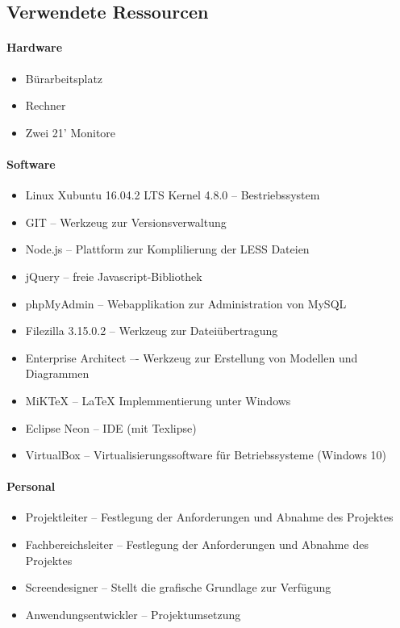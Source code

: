 \subsection{Verwendete Ressourcen}
\label{list:Ressourcenplanung}

\paragraph{Hardware}
\begin{itemize}
	\item Bürarbeitsplatz
	\item Rechner
	\item Zwei 21' Monitore
\end{itemize}

\paragraph{Software}
\begin{itemize}
	\item Linux Xubuntu 16.04.2 LTS Kernel 4.8.0 -- Bestriebssystem
	\item GIT -- Werkzeug zur Versionsverwaltung
	\item Node.js -- Plattform zur Komplilierung der LESS Dateien
	\item jQuery -- freie Javascript-Bibliothek	
	\item phpMyAdmin -- Webapplikation zur Administration von MySQL
	\item Filezilla 3.15.0.2 -- Werkzeug zur Dateiübertragung
	\item Enterprise Architect –- Werkzeug zur Erstellung von Modellen und
	Diagrammen
	\item MiKTeX -- LaTeX Implemmentierung unter Windows
	\item Eclipse Neon -- \ac{IDE} (mit Texlipse)
	\item VirtualBox -- Virtualisierungssoftware für Betriebssysteme (Windows
	10)

\end{itemize}

\paragraph{Personal}
\begin{itemize}
	\item Projektleiter -- Festlegung der Anforderungen und Abnahme des Projektes

	\item Fachbereichsleiter -- Festlegung der Anforderungen und Abnahme des
	Projektes
	\item Screendesigner -- Stellt die grafische Grundlage zur Verfügung
	\item Anwendungsentwickler -- Projektumsetzung
\end{itemize}